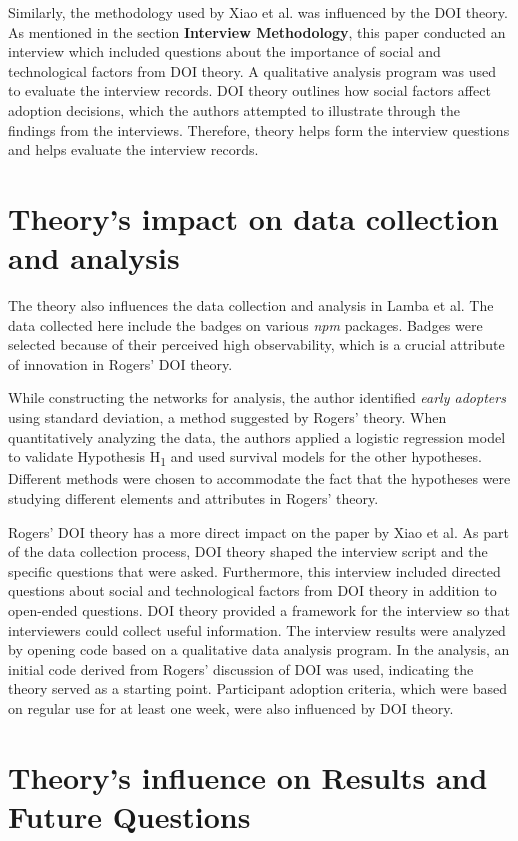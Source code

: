 \documentclass[journal,12pt,onecolumn,]{IEEEtran}
\begin{document}
Similarly, the methodology used by Xiao et al. was influenced by the DOI theory. As mentioned in the section \textbf{Interview Methodology}, this paper conducted an interview which included questions about the importance of social and technological factors from DOI theory.
A qualitative analysis program was used to evaluate the interview records. DOI theory outlines how social factors affect adoption decisions, which the authors attempted to illustrate through the findings from the interviews. Therefore, theory helps form the interview questions and helps evaluate the interview records.
\section{Theory's impact on data collection and analysis}
The theory also influences the data collection and analysis in Lamba et al. The data collected here include the badges on various \textit{npm} packages. Badges were selected because of their perceived high observability, which is a crucial attribute of innovation in Rogers' DOI theory.

While constructing the networks for analysis, the author identified \textit{early adopters} using standard deviation, a method suggested by Rogers' theory.
When quantitatively analyzing the data, the authors applied a logistic regression model to validate Hypothesis H\textsubscript{1} and used survival models for the other hypotheses. Different methods were chosen to accommodate the fact that the hypotheses were studying different elements and attributes in Rogers' theory.

Rogers' DOI theory has a more direct impact on the paper by Xiao et al. As part of the data collection process, DOI theory shaped the interview script and the specific questions that were asked. Furthermore, this interview included directed questions about social and technological factors from DOI theory in addition to open-ended questions.
DOI theory provided a framework for the interview so that interviewers could collect useful information. The interview results were analyzed by opening code based on a qualitative data analysis program. In the analysis, an initial code derived from Rogers' discussion of DOI was used, indicating the theory served as a starting point.
Participant adoption criteria, which were based on regular use for at least one week, were also influenced by DOI theory.

\section{Theory's influence on Results and Future Questions}
\end{document}

